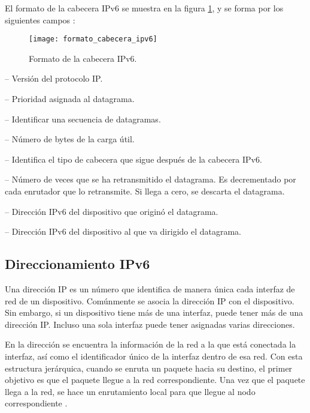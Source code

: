 El formato de la cabecera IPv6 se muestra en la figura
\ref{fig:formato_cabecera_ipv6}, y se forma por los siguientes campos
\cite{RFC2460}:

\begin{figure}[th]
\centering
\texttt{[image: formato\_cabecera\_ipv6]}
\decoRule
\caption[Cabecera IPv6]{Formato de la cabecera IPv6.}
\label{fig:formato_cabecera_ipv6}
\end{figure}

 -- Versión del protocolo IP.

 -- Prioridad asignada al datagrama.

 -- Identificar una secuencia de
datagramas.

 -- Número de bytes de la carga útil.

 -- Identifica el tipo de cabecera que
sigue después de la cabecera IPv6.

 -- Número de veces que se ha
retransmitido el datagrama. Es decrementado por cada enrutador que lo
retransmite. Si llega a cero, se descarta el datagrama.

 -- Dirección IPv6 del dispositivo
que originó el datagrama.

 -- Dirección IPv6 del dispositivo
al que va dirigido el datagrama.

\subsection{Direccionamiento IPv6}

\label{subsec:direccionamiento_ipv6}

Una dirección IP es un número que identifica de manera única cada interfaz de
red de un dispositivo. Comúnmente se asocia la dirección IP con el dispositivo.
Sin embargo, si un dispositivo tiene más de una interfaz, puede tener más de una
dirección IP. Incluso una sola interfaz puede tener asignadas varias
direcciones.

En la dirección se encuentra la información de la red a la que está conectada la
interfaz, así como el identificador único de la interfaz dentro de esa red. Con
esta estructura jerárquica, cuando se enruta un paquete hacia su destino, el
primer objetivo es que el paquete llegue a la red correspondiente. Una vez que
el paquete llega a la red, se hace un enrutamiento local para que llegue al
nodo correspondiente \cite{Kurose2013}.

